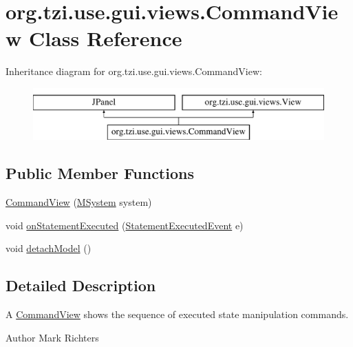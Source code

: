 \hypertarget{classorg_1_1tzi_1_1use_1_1gui_1_1views_1_1_command_view}{\section{org.\-tzi.\-use.\-gui.\-views.\-Command\-View Class Reference}
\label{classorg_1_1tzi_1_1use_1_1gui_1_1views_1_1_command_view}
}
Inheritance diagram for org.\-tzi.\-use.\-gui.\-views.\-Command\-View\-:\begin{figure}[H]
\begin{center}
\leavevmode
\includegraphics[height=2.000000cm]{classorg_1_1tzi_1_1use_1_1gui_1_1views_1_1_command_view}
\end{center}
\end{figure}
\subsection*{Public Member Functions}
\begin{DoxyCompactItemize}
\item 
\hyperlink{classorg_1_1tzi_1_1use_1_1gui_1_1views_1_1_command_view_af98c6d0b05aedb65013aeced2f7f5e28}{Command\-View} (\hyperlink{classorg_1_1tzi_1_1use_1_1uml_1_1sys_1_1_m_system}{M\-System} system)
\item 
void \hyperlink{classorg_1_1tzi_1_1use_1_1gui_1_1views_1_1_command_view_a3dc7dd76043664e0e672048e5dce2049}{on\-Statement\-Executed} (\hyperlink{classorg_1_1tzi_1_1use_1_1uml_1_1sys_1_1events_1_1_statement_executed_event}{Statement\-Executed\-Event} e)
\item 
void \hyperlink{classorg_1_1tzi_1_1use_1_1gui_1_1views_1_1_command_view_a40f101cd396e9ca7bbe3e3f51407a4a1}{detach\-Model} ()
\end{DoxyCompactItemize}


\subsection{Detailed Description}
A \hyperlink{classorg_1_1tzi_1_1use_1_1gui_1_1views_1_1_command_view}{Command\-View} shows the sequence of executed state manipulation commands.

\begin{DoxyAuthor}{Author}
Mark Richters 
\end{DoxyAuthor}


